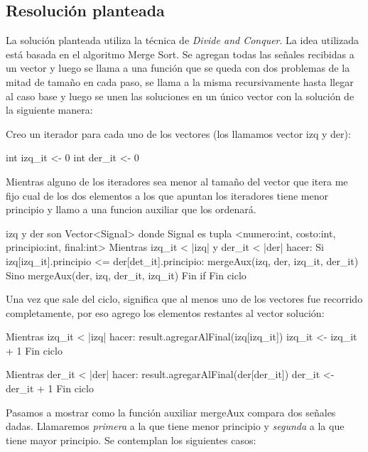 \subsection{Resolución planteada}
La solución planteada utiliza la técnica de \textit{Divide and Conquer}. La idea utilizada está basada en el algoritmo Merge Sort.
Se agregan todas las señales recibidas a un vector y luego se llama a una función que se queda con dos problemas de la mitad de tamaño en cada paso, se llama a la misma recursivamente hasta llegar al caso base y luego se unen las soluciones en un único vector con la solución de la siguiente manera:


Creo un iterador para cada uno de los vectores (los llamamos vector izq y der):

\begin{codesnippet}
int izq_it <- 0
int der_it <- 0
\end{codesnippet}


Mientras alguno de los iteradores sea menor al tamaño del vector que itera me fijo
cual de los dos elementos a los que apuntan los iteradores tiene menor principio
y llamo a una funcion auxiliar que los ordenará.

\begin{codesnippet}
izq y der son Vector<Signal>
    donde Signal es tupla <numero:int, costo:int, principio:int, final:int>
Mientras izq_it < |izq| y der_it < |der| hacer:
    Si izq[izq_it].principio <= der[det_it].principio:
        mergeAux(izq, der, izq_it, der_it)
    Sino
        mergeAux(der, izq, der_it, izq_it)
    Fin if
Fin ciclo
\end{codesnippet}    


Una vez que sale del ciclo, significa que al menos uno de los vectores fue recorrido
completamente, por eso agrego los elementos restantes al vector solución:

\begin{codesnippet}
Mientras izq_it < |izq| hacer:
    result.agregarAlFinal(izq[izq_it])
    izq_it <- izq_it + 1
Fin ciclo

Mientras der_it < |der| hacer:
    result.agregarAlFinal(der[der_it])
    der_it <- der_it + 1
Fin ciclo
\end{codesnippet}    


\vspace{1em}
Pasamos a mostrar como la función auxiliar mergeAux compara dos señales dadas. Llamaremos \textit{primera} a la que tiene menor principio y \textit{segunda} a la que tiene mayor principio. Se contemplan los siguientes casos:


